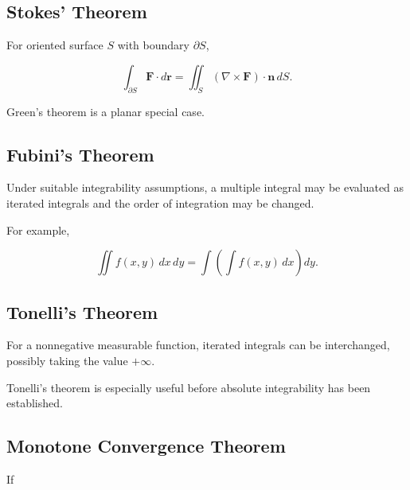 \subsection{Stokes' Theorem}
\label{subsec:stokes-theorem-summary}

For oriented surface \(S\) with boundary \(\partial S\),

\[
\boxed{
\int_{\partial S}
\mathbf{F}\cdot d\mathbf{r}
=
\iint_S
(\nabla\times\mathbf{F})
\cdot\mathbf{n}
\,dS.
}
\]

Green's theorem is a planar special case.

\subsection{Fubini's Theorem}
\label{subsec:fubini-summary}

Under suitable integrability assumptions, a multiple integral may be
evaluated as iterated integrals and the order of integration may be changed.

For example,

\[
\boxed{
\iint
f(x,y)\,dx\,dy
=
\int
\left(
\int
f(x,y)\,dx
\right)
dy.
}
\]

\subsection{Tonelli's Theorem}
\label{subsec:tonelli-summary}

For a nonnegative measurable function, iterated integrals can be interchanged,
possibly taking the value \(+\infty\).

Tonelli's theorem is especially useful before absolute integrability has been
established.

\subsection{Monotone Convergence Theorem}
\label{subsec:monotone-convergence-theorem-summary}

If

